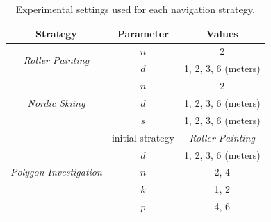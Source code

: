 \begin{table}[h!]
	\centering
	\begin{tabular}{|c|c|c|}
		\hline
		Strategy & Parameter & Values \\
		\hline
		\multirow{2}{*}{\textit{Roller Painting}} & $n$ & 2 \\
		& $d$ & 1, 2, 3, 6 (meters) \\
		\hline
		\multirow{3}{*}{\textit{Nordic Skiing}} & $n$ & 2 \\
		& $d$ & 1, 2, 3, 6 (meters) \\
		& $s$ & 1, 2, 3, 6 (meters) \\
		\hline
		\multirow{5}{*}{\textit{Polygon Investigation}} & initial strategy & \textit{Roller Painting} \\
		& $d$ & 1, 2, 3, 6 (meters) \\
		& $n$ & 2, 4 \\
		& $k$ & 1, 2 \\
		& $p$ & 4, 6 \\
		\hline
	\end{tabular}
	\caption{Experimental settings used for each navigation strategy.}
	\label{tab:exp_params}
\end{table}

